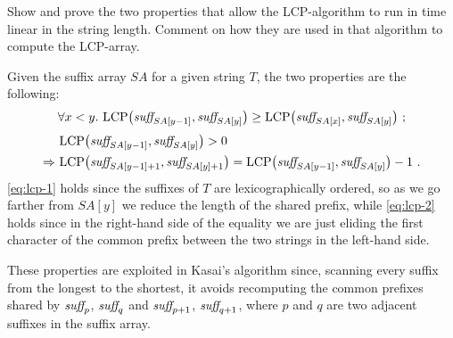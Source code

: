\exercise

Show and prove the two properties that allow the LCP-algorithm to run in time
linear in the string length. Comment on how they are used in that algorithm to
compute the LCP-array.

\solution

Given the suffix array $SA$ for a given string $T$, the two properties are the
following:
%
\begin{align}\label{eq:lcp-1}
  \forall x < y.\ \text{LCP}\big(\text{\it suff}_{SA[y-1]}, \text{\it
  suff}_{SA[y]}\big) \ge \text{LCP}\big(\text{\it suff}_{SA[x]}, \text{\it
  suff}_{SA[y]}\big)\ ;
\end{align}
%
\begin{align}\label{eq:lcp-2}
    &\text{LCP}\big(\text{\it suff}_{SA[y-1]}, \text{\it suff}_{SA[y]}\big) > 0
    \\\Rightarrow\ &\text{LCP}\big(\text{\it suff}_{SA[y-1] + 1}, \text{\it
    suff}_{SA[y] + 1}\big) = \text{LCP}\big(\text{\it suff}_{SA[y-1]}, \text{\it
    suff}_{SA[y]}\big) - 1\ .\nonumber
\end{align}
%
\autoref{eq:lcp-1} holds since the suffixes of $T$ are lexicographically
ordered, so as we go farther from $SA[y]$ we reduce the length of the shared
prefix, while \autoref{eq:lcp-2} holds since in the right-hand side of the
equality we are just eliding the first character of the common prefix between
the two strings in the left-hand side.

These properties are exploited in Kasai's algorithm since, scanning every suffix
from the longest to the shortest, it avoids recomputing the common prefixes
shared by $\text{\it suff}_p$, $\text{\it suff}_q$ and $\text{\it suff}_{p+1}$,
$\text{\it suff}_{q+1}$, where $p$ and $q$ are two adjacent suffixes in the
suffix array.
